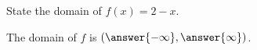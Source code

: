 \documentclass{ximera}
\author{Carl Stitz \and Jeff Zeager \and Bart Snapp \and Matthew Carr}
\begin{document}
\begin{exercise}



State the domain of $f(x) = 2-x$.
\begin{prompt}
The domain of $f$ is $(\answer{-\infty},\answer{\infty})$.
\end{prompt}

\end{exercise}
\end{document}
